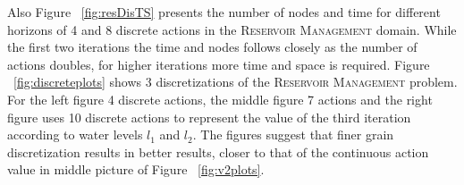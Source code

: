 \documentclass[twoside,11pt]{article}
\newcommand{\InventoryControl}{\textsc{Inventory Control }}
\newcommand{\WaterReservoir}{\textsc{Reservoir Management }}
\begin{document}
Also Figure ~\ref{fig:resDisTS} presents the number of nodes and time for different horizons of 4 and 8 discrete actions in the \WaterReservoir domain. While the first two iterations the time and nodes follows closely as the number of actions doubles, for higher iterations more time and space is required. 
Figure ~\ref{fig:discreteplots} shows 3 discretizations of the \WaterReservoir problem. For the left figure 4 discrete actions, the middle figure 7 actions and the right figure uses 10 discrete actions to represent the value of the third iteration according to water levels $l_1$ and $l_2$. The figures suggest that finer grain discretization results in better results, closer to that of the continuous action value in middle picture of Figure ~\ref{fig:v2plots}. 
\end{document}
